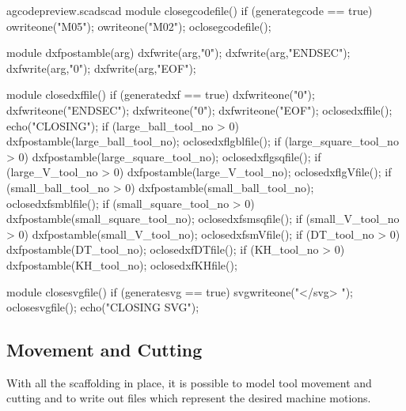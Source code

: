 \documentclass{ltxdoc}
\begin{document}
\lstset{firstnumber=\thegcpscad}
\begin{writecode}{a}{gcodepreview.scad}{scad}
module closegcodefile() {
if (generategcode == true) {
    owriteone("M05");
    owriteone("M02");
	oclosegcodefile();
}
}

module dxfpostamble(arg) {
    dxfwrite(arg,"0");
    dxfwrite(arg,"ENDSEC");
    dxfwrite(arg,"0");
    dxfwrite(arg,"EOF");
}

module closedxffile() {
if (generatedxf == true) {
    dxfwriteone("0");
    dxfwriteone("ENDSEC");
    dxfwriteone("0");
    dxfwriteone("EOF");
	oclosedxffile();
    echo("CLOSING");
if (large_ball_tool_no >  0) {	dxfpostamble(large_ball_tool_no);
    oclosedxflgblfile();
} 
if (large_square_tool_no >  0) {	dxfpostamble(large_square_tool_no);
    oclosedxflgsqfile();
} 
if (large_V_tool_no >  0) {	dxfpostamble(large_V_tool_no);
    oclosedxflgVfile();
} 
if (small_ball_tool_no >  0) {	dxfpostamble(small_ball_tool_no);
    oclosedxfsmblfile();
} 
if (small_square_tool_no >  0) {	dxfpostamble(small_square_tool_no);
    oclosedxfsmsqfile();
} 
if (small_V_tool_no >  0) {	dxfpostamble(small_V_tool_no);
    oclosedxfsmVfile();
} 
if (DT_tool_no >  0) {	dxfpostamble(DT_tool_no);
    oclosedxfDTfile();
} 
if (KH_tool_no >  0) {	dxfpostamble(KH_tool_no);
    oclosedxfKHfile();
} 
    }
}

module closesvgfile() {
if (generatesvg == true) {
    svgwriteone("</svg> ");
	oclosesvgfile();
    echo("CLOSING SVG");
    }
}

\end{writecode}
\addtocounter{gcpscad}{58}
 
\subsection{Movement and Cutting}

%
With all the scaffolding in place, it is possible to model tool movement
and cutting and to write out files which represent the desired machine motions.
 
\end{document}
